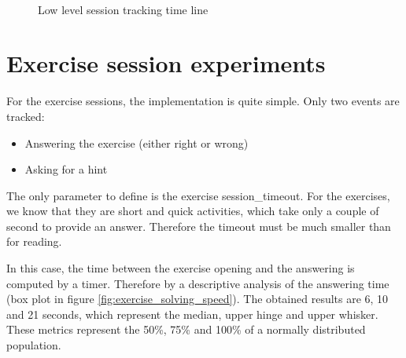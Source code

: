\begin{figure}[!htb]
	\myfloatalign
	 \quad 
		
	 \\
	\caption{Low level session tracking time line}\label{fig:detailed_session_comparison}
\end{figure}

\section{Exercise session experiments}
For the exercise sessions, the implementation is quite simple. Only two events are tracked:
\begin{itemize}
	\item Answering the exercise (either right or wrong)
	\item Asking for a hint
\end{itemize}

The only parameter to define is the exercise session\_timeout. For the exercises, we know that they are short and quick activities, which take only a couple of second to provide an answer. Therefore the timeout must be much smaller than for reading.

In this case, the time between the exercise opening and the answering is computed by a timer. Therefore by a descriptive analysis of the answering time (box plot in figure \ref{fig:exercise_solving_speed}). The obtained results are 6, 10 and 21 seconds, which represent the median, upper hinge and upper whisker. These metrics represent the 50\%, 75\% and 100\% of a normally distributed population. 

